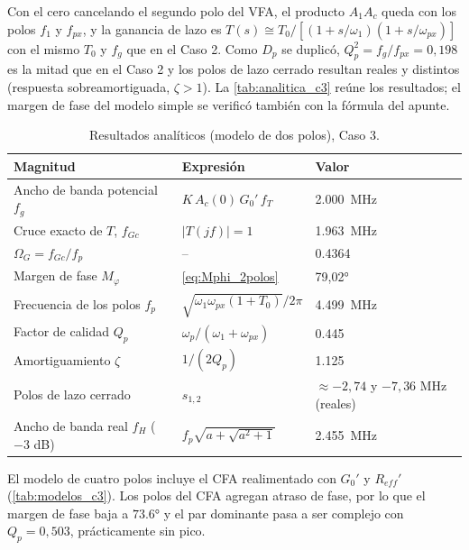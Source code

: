 Con el cero cancelando el segundo polo del VFA, el producto $A_1A_c$ queda con los polos $f_1$ y $f_{px}$, y la ganancia de lazo es $T(s) \cong T_0/[(1+s/\omega_1)(1+s/\omega_{px})]$ con el mismo $T_0$ y $f_g$ que en el Caso 2. Como $D_p$ se duplicó, $Q_p^2 = f_g/f_{px} = 0{,}198$ es la mitad que en el Caso 2 y los polos de lazo cerrado resultan reales y distintos (respuesta sobreamortiguada, $\zeta>1$). La \autoref{tab:analitica_c3} reúne los resultados; el margen de fase del modelo simple se verificó también con la fórmula del apunte.

\begin{table}[H]
\centering
\caption{Resultados analíticos (modelo de dos polos), Caso 3.}
\label{tab:analitica_c3}
\small
\setlength{\tabcolsep}{4pt}
\begin{tabular}{>{\raggedright\arraybackslash}p{} >{\centering\arraybackslash}p{} >{\centering\arraybackslash}p{}}
\toprule
\textbf{Magnitud} & \textbf{Expresión} & \textbf{Valor} \\
\midrule
Ancho de banda potencial $f_g$ & $K\,A_c(0)\,G_0'\,f_T$ & \SI{2,000}{MHz} \\
Cruce exacto de $T$, $f_{Gc}$ & $|T(jf)|=1$ & \SI{1,963}{MHz} \\
$\Omega_G = f_{Gc}/f_p$ & -- & \num{0,4364} \\
Margen de fase $M_\varphi$ & \autoref{eq:Mphi_2polos} & \ang{79,02} \\
Frecuencia de los polos $f_p$ & $\sqrt{\omega_1\omega_{px}(1+T_0)}/2\pi$ & \SI{4,499}{MHz} \\
Factor de calidad $Q_p$ & $\omega_p/(\omega_1+\omega_{px})$ & \num{0,445} \\
Amortiguamiento $\zeta$ & $1/(2Q_p)$ & \num{1,125} \\
Polos de lazo cerrado & $s_{1,2}$ & $\approx -2{,}74$ y $-7{,}36$ MHz (reales) \\
Ancho de banda real $f_H$ ($-3$ dB) & $f_p\sqrt{a+\sqrt{a^2+1}}$ & \SI{2,455}{MHz} \\
\bottomrule
\end{tabular}
\end{table}

El modelo de cuatro polos incluye el CFA realimentado con $G_0'$ y $R_{eff}'$ (\autoref{tab:modelos_c3}). Los polos del CFA agregan atraso de fase, por lo que el margen de fase baja a $\ang{73,6}$ y el par dominante pasa a ser complejo con $Q_p = 0{,}503$, prácticamente sin pico.

